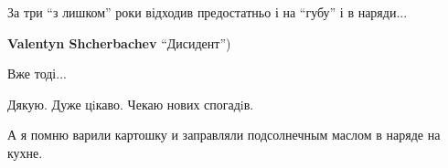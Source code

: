 \begin{itemize}
За три \enquote{з лишком} роки відходив предостатньо і на \enquote{губу} і в наряди...

\begin{itemize} %
\textbf{Valentyn Shcherbachev} \enquote{Дисидент})

Вже тоді...
\end{itemize} %

Дякую. Дуже цiкаво. Чекаю нових спогадiв.

А я помню варили картошку и заправляли подсолнечным маслом в наряде на кухне.

\end{itemize} %
